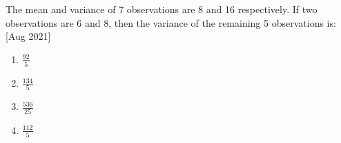 	\item 
	The mean and variance of 7 observations are 8 and 16 respectively. If two observations are 6 and 8, then the variance of the remaining 5 observations is:
	\hfill [Aug 2021]
		\begin{enumerate}
			\item $\frac{92}{5}$
			\item $\frac{134}{5}$
			\item $\frac{536}{25}$
			\item $\frac{112}{5}$
		\end{enumerate}

